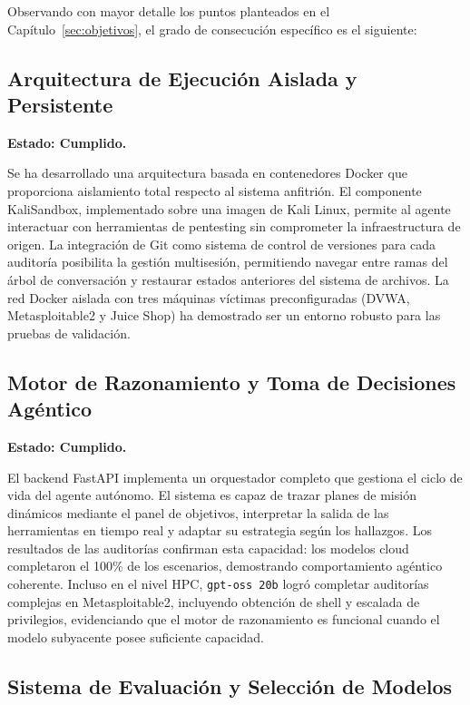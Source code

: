 Observando con mayor detalle los puntos planteados en el Capítulo~\ref{sec:objetivos}, el grado de consecución específico es el siguiente:

\subsection{Arquitectura de Ejecución Aislada y Persistente}

\textbf{Estado: Cumplido.}

Se ha desarrollado una arquitectura basada en contenedores Docker que proporciona aislamiento total respecto al sistema anfitrión. El componente KaliSandbox, implementado sobre una imagen de Kali Linux, permite al agente interactuar con herramientas de pentesting sin comprometer la infraestructura de origen. La integración de Git como sistema de control de versiones para cada auditoría posibilita la gestión multisesión, permitiendo navegar entre ramas del árbol de conversación y restaurar estados anteriores del sistema de archivos. La red Docker aislada con tres máquinas víctimas preconfiguradas (DVWA, Metasploitable2 y Juice Shop) ha demostrado ser un entorno robusto para las pruebas de validación.

\subsection{Motor de Razonamiento y Toma de Decisiones Agéntico}

\textbf{Estado: Cumplido.}

El backend FastAPI implementa un orquestador completo que gestiona el ciclo de vida del agente autónomo. El sistema es capaz de trazar planes de misión dinámicos mediante el panel de objetivos, interpretar la salida de las herramientas en tiempo real y adaptar su estrategia según los hallazgos. Los resultados de las auditorías confirman esta capacidad: los modelos cloud completaron el 100\% de los escenarios, demostrando comportamiento agéntico coherente. Incluso en el nivel HPC, \texttt{gpt-oss 20b} logró completar auditorías complejas en Metasploitable2, incluyendo obtención de shell y escalada de privilegios, evidenciando que el motor de razonamiento es funcional cuando el modelo subyacente posee suficiente capacidad.

\subsection{Sistema de Evaluación y Selección de Modelos}

